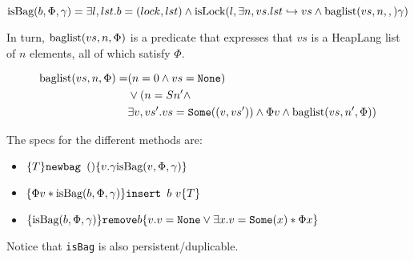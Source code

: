 \[ \text{isBag}{(b, \Phi, \gamma)}  = \exists l, lst. b = (lock, lst) \land \text{isLock}{(l, \exists n, vs. lst \hookrightarrow vs \land \text{baglist}(vs, n, ,) \gamma)}  \]

In turn, $\text{baglist}(vs, n, \Phi)$ is a predicate that expresses that $vs$ is a HeapLang list of $n$ elements, all of which satisfy $\Phi$.

\begin{align*}
\text{baglist}(vs, n, \Phi) =& (n = 0 \land vs = \texttt{None}) \\
& \lor (n = S n' \land \\
& \exists v, vs'. vs = \texttt{Some}((v, vs')) \land \Phi v \land \text{baglist}(vs, n', \Phi) ) 
\end{align*}


The specs for the different methods are:
\begin{itemize}

\item $\{T\} \texttt{newbag } () \{v. \gamma \text{isBag}{(v, \Phi, \gamma)}\}$

\item $\{\Phi v * \text{isBag}{(b, \Phi, \gamma)}\} \texttt{insert } b \text{ } v \{T\}$

\item $\{\text{isBag}{(b, \Phi, \gamma)}\} \texttt{remove} b \{v. v = \texttt{None} \lor \exists x. v = \texttt{Some}(x) * \Phi x\}$

\end{itemize}

Notice that \texttt{isBag} is also persistent/duplicable.

